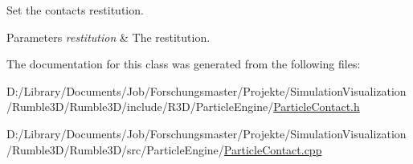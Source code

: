 Set the contact\textquotesingle{}s restitution. 


\begin{DoxyParams}{Parameters}
{\em restitution} & The restitution. \\
\hline
\end{DoxyParams}


The documentation for this class was generated from the following files\+:\begin{DoxyCompactItemize}
\item 
D\+:/\+Library/\+Documents/\+Job/\+Forschungsmaster/\+Projekte/\+Simulation\+Visualization/\+Rumble3\+D/\+Rumble3\+D/include/\+R3\+D/\+Particle\+Engine/\mbox{\hyperlink{_particle_contact_8h}{Particle\+Contact.\+h}}\item 
D\+:/\+Library/\+Documents/\+Job/\+Forschungsmaster/\+Projekte/\+Simulation\+Visualization/\+Rumble3\+D/\+Rumble3\+D/src/\+Particle\+Engine/\mbox{\hyperlink{_particle_contact_8cpp}{Particle\+Contact.\+cpp}}\end{DoxyCompactItemize}

